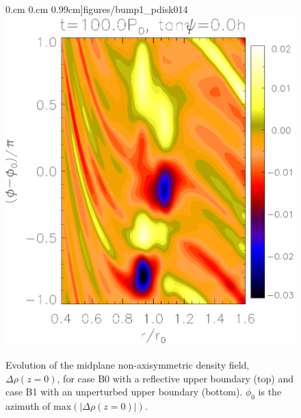 \begin{figure}
     0.cm 0.cm
     0.99cm]{figures/bump1_pdisk014}\includegraphics[scale=.27,clip=true,clip=true,trim=2.3cm
     0.cm 0.cm
     0.99cm]{figures/bump1_pdisk019}  
   \caption{Evolution of the midplane non-axisymmetric density field,
     $\Delta\rho(z=0)$, for case B0 with a reflective upper boundary
     (top) and case  
     B1  with an unperturbed upper boundary (bottom). $\phi_0$ is the
     azimuth of $\mathrm{max}(|\Delta\rho(z=0)|)$.   
   \label{bump0_bump1}}
 \end{figure}

